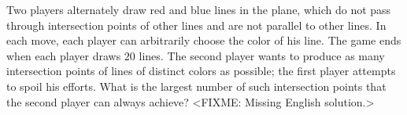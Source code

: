 \problem
Two players alternately draw red and blue lines in the plane, which do not pass
through intersection points of other lines and are not parallel to other lines.
In each move, each player can arbitrarily choose the color of his line.
The game ends when each player draws $20$ lines.
The second player wants to produce as many intersection points of lines of
distinct colors as possible; the first player attempts to spoil his efforts.
What is the largest number of such intersection points that the second player
can always achieve?
\solution
<FIXME: Missing English solution.>
\endproblem
